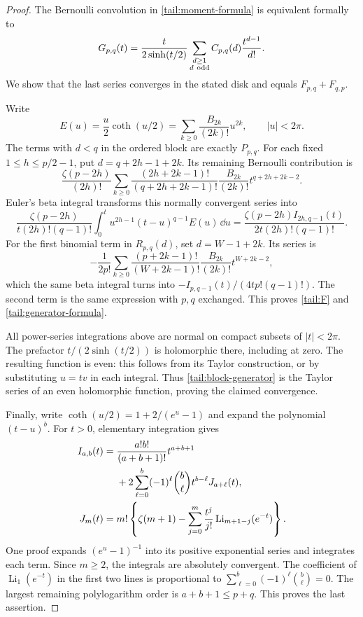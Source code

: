 \begin{proof}
The Bernoulli convolution in \eqref{tail:moment-formula} is
equivalent formally to
\begin{equation}\label{tail:block-generator}
 G_{p,q}(t)=\frac{t}{2\sinh(t/2)}
           \sum_{\substack{d\ge1\\d\ {\rm odd}}}
                        C_{p,q}(d)\frac{t^{d-1}}{d!}.
\end{equation}
We show that the last series converges in the stated disk and
equals \(F_{p,q}+F_{q,p}\).

Write
\[
 E(u)=\frac u2\coth(u/2)
     =\sum_{k\ge0}\frac{B_{2k}}{(2k)!}u^{2k},
 \qquad |u|<2\pi.
\]
The terms with \(d<q\) in the ordered block are exactly
\(P_{p,q}\). For each fixed \(1\le h\le p/2-1\), put
\(d=q+2h-1+2k\). Its remaining Bernoulli contribution is
\[
 \frac{\zeta(p-2h)}{(2h)!}
 \sum_{k\ge0}\frac{(2h+2k-1)!}{(q+2h+2k-1)!}
            \frac{B_{2k}}{(2k)!}t^{q+2h+2k-2}.
\]
Euler's beta integral transforms this normally convergent series
into
\[
 \frac{\zeta(p-2h)}{t(2h)!(q-1)!}
       \int_0^t u^{2h-1}(t-u)^{q-1}E(u)\,\dd u
   =\frac{\zeta(p-2h)I_{2h,q-1}(t)}
          {2t(2h)!(q-1)!}.
\]
For the first binomial term in \(R_{p,q}(d)\), set
\(d=W-1+2k\). Its series is
\[
 -\frac1{2p!}\sum_{k\ge0}
    \frac{(p+2k-1)!}{(W+2k-1)!}
         \frac{B_{2k}}{(2k)!}t^{W+2k-2},
\]
which the same beta integral turns into
\(-I_{p,q-1}(t)/(4t p!(q-1)!)\). The second term is the
same expression with \(p,q\) exchanged. This proves
\eqref{tail:F} and \eqref{tail:generator-formula}.

All power-series integrations above are normal on compact subsets
of \(|t|<2\pi\). The prefactor \(t/(2\sinh(t/2))\) is
holomorphic there, including at zero. The resulting function is
even: this follows from its Taylor construction, or by substituting
\(u=tv\) in each integral. Thus
\eqref{tail:block-generator} is the Taylor series of an even
holomorphic function, proving the claimed convergence.

Finally, write \(\coth(u/2)=1+2/(e^u-1)\) and expand the
polynomial \((t-u)^b\). For \(t>0\), elementary integration
gives
\begin{align}\label{tail:finite-Li}
 I_{a,b}(t)={}&\frac{a!b!}{(a+b+1)!}t^{a+b+1}\notag\\
 &+2\sum_{\ell=0}^{b}(-1)^\ell\binom b\ell
                     t^{b-\ell}J_{a+\ell}(t),\notag\\
 J_m(t)={}&m!\left\{\zeta(m+1)
       -\sum_{j=0}^{m}\frac{t^j}{j!}
                  \operatorname{Li}_{m+1-j}(e^{-t})\right\}.
\end{align}
One proof expands \((e^u-1)^{-1}\) into its positive exponential
series and integrates each term. Since \(m\ge2\), the
integrals are absolutely convergent. The coefficient of
\(\operatorname{Li}_1(e^{-t})\) in the first two lines is
proportional to \(\sum_{\ell=0}^{b}(-1)^\ell\binom b\ell=0\).
The largest remaining polylogarithm order is
\(a+b+1\le p+q\). This proves the last assertion.
\end{proof}

